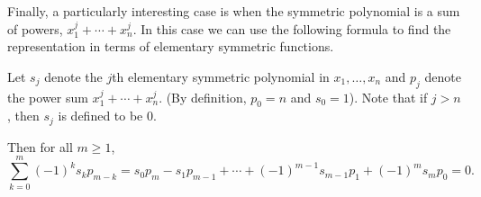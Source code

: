Finally, a particularly interesting case is when the symmetric polynomial is a sum of powers, $x_1^j+\cdots +x_n^j$. In this case we can use the following formula to find the representation in terms of elementary symmetric functions.
\begin{thm}
Let $s_j$ denote the $j$th elementary symmetric polynomial in $x_1,\ldots, x_n$ and $p_j$ denote the power sum $x_1^j+\cdots+x_n^j$. (By definition, $p_0=n$ and $s_0=1$). Note that if $j>n$, then $s_j$ is defined to be 0.

Then for all $m\geq 1$,
\[
\sum_{k=0}^{m}(-1)^ks_kp_{m-k}=s_0p_m-s_1p_{m-1}+\cdots +(-1)^{m-1}s_{m-1}p_1+(-1)^m s_mp_0=0.
\]
\end{thm}
